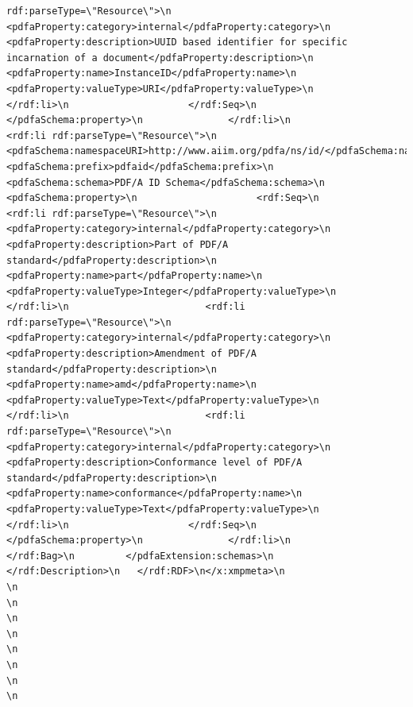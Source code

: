 \documentclass[
]{book}
\begin{document}
\begin{verbatim}
rdf:parseType=\"Resource\">\n                           <pdfaProperty:category>internal</pdfaProperty:category>\n                           <pdfaProperty:description>UUID based identifier for specific incarnation of a document</pdfaProperty:description>\n                           <pdfaProperty:name>InstanceID</pdfaProperty:name>\n                           <pdfaProperty:valueType>URI</pdfaProperty:valueType>\n                        </rdf:li>\n                     </rdf:Seq>\n                  </pdfaSchema:property>\n               </rdf:li>\n               <rdf:li rdf:parseType=\"Resource\">\n                  <pdfaSchema:namespaceURI>http://www.aiim.org/pdfa/ns/id/</pdfaSchema:namespaceURI>\n                  <pdfaSchema:prefix>pdfaid</pdfaSchema:prefix>\n                  <pdfaSchema:schema>PDF/A ID Schema</pdfaSchema:schema>\n                  <pdfaSchema:property>\n                     <rdf:Seq>\n                        <rdf:li rdf:parseType=\"Resource\">\n                           <pdfaProperty:category>internal</pdfaProperty:category>\n                           <pdfaProperty:description>Part of PDF/A standard</pdfaProperty:description>\n                           <pdfaProperty:name>part</pdfaProperty:name>\n                           <pdfaProperty:valueType>Integer</pdfaProperty:valueType>\n                        </rdf:li>\n                        <rdf:li rdf:parseType=\"Resource\">\n                           <pdfaProperty:category>internal</pdfaProperty:category>\n                           <pdfaProperty:description>Amendment of PDF/A standard</pdfaProperty:description>\n                           <pdfaProperty:name>amd</pdfaProperty:name>\n                           <pdfaProperty:valueType>Text</pdfaProperty:valueType>\n                        </rdf:li>\n                        <rdf:li rdf:parseType=\"Resource\">\n                           <pdfaProperty:category>internal</pdfaProperty:category>\n                           <pdfaProperty:description>Conformance level of PDF/A standard</pdfaProperty:description>\n                           <pdfaProperty:name>conformance</pdfaProperty:name>\n                           <pdfaProperty:valueType>Text</pdfaProperty:valueType>\n                        </rdf:li>\n                     </rdf:Seq>\n                  </pdfaSchema:property>\n               </rdf:li>\n            </rdf:Bag>\n         </pdfaExtension:schemas>\n      </rdf:Description>\n   </rdf:RDF>\n</x:xmpmeta>\n                                                                                                    \n                                                                                                    \n                                                                                                    \n                                                                                                    \n                                                                                                    \n                                                                                                    \n                                                                                                    \n                                                                                                    \n                               
\end{verbatim}
\end{document}
